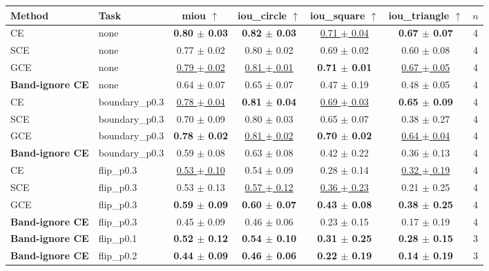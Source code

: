 \begin{tabular}{llccccc}
\toprule
Method & Task & miou $\uparrow$ & iou\_circle $\uparrow$ & iou\_square $\uparrow$ & iou\_triangle $\uparrow$ & $n$ \\
\midrule
CE & none & \textbf{0.80 $\pm$ 0.03} & \textbf{0.82 $\pm$ 0.03} & \underline{0.71 $\pm$ 0.04} & \textbf{0.67 $\pm$ 0.07} & 4 \\
SCE & none & 0.77 $\pm$ 0.02 & 0.80 $\pm$ 0.02 & 0.69 $\pm$ 0.02 & 0.60 $\pm$ 0.08 & 4 \\
GCE & none & \underline{0.79 $\pm$ 0.02} & \underline{0.81 $\pm$ 0.01} & \textbf{0.71 $\pm$ 0.01} & \underline{0.67 $\pm$ 0.05} & 4 \\
\textbf{Band-ignore CE} & none & 0.64 $\pm$ 0.07 & 0.65 $\pm$ 0.07 & 0.47 $\pm$ 0.19 & 0.48 $\pm$ 0.05 & 4 \\
\midrule
CE & boundary\_p0.3 & \underline{0.78 $\pm$ 0.04} & \textbf{0.81 $\pm$ 0.04} & \underline{0.69 $\pm$ 0.03} & \textbf{0.65 $\pm$ 0.09} & 4 \\
SCE & boundary\_p0.3 & 0.70 $\pm$ 0.09 & 0.80 $\pm$ 0.03 & 0.65 $\pm$ 0.07 & 0.38 $\pm$ 0.27 & 4 \\
GCE & boundary\_p0.3 & \textbf{0.78 $\pm$ 0.02} & \underline{0.81 $\pm$ 0.02} & \textbf{0.70 $\pm$ 0.02} & \underline{0.64 $\pm$ 0.04} & 4 \\
\textbf{Band-ignore CE} & boundary\_p0.3 & 0.59 $\pm$ 0.08 & 0.63 $\pm$ 0.08 & 0.42 $\pm$ 0.22 & 0.36 $\pm$ 0.13 & 4 \\
\midrule
CE & flip\_p0.3 & \underline{0.53 $\pm$ 0.10} & 0.54 $\pm$ 0.09 & 0.28 $\pm$ 0.14 & \underline{0.32 $\pm$ 0.19} & 4 \\
SCE & flip\_p0.3 & 0.53 $\pm$ 0.13 & \underline{0.57 $\pm$ 0.12} & \underline{0.36 $\pm$ 0.23} & 0.21 $\pm$ 0.25 & 4 \\
GCE & flip\_p0.3 & \textbf{0.59 $\pm$ 0.09} & \textbf{0.60 $\pm$ 0.07} & \textbf{0.43 $\pm$ 0.08} & \textbf{0.38 $\pm$ 0.25} & 4 \\
\textbf{Band-ignore CE} & flip\_p0.3 & 0.45 $\pm$ 0.09 & 0.46 $\pm$ 0.06 & 0.23 $\pm$ 0.15 & 0.17 $\pm$ 0.19 & 4 \\
\midrule
\textbf{Band-ignore CE} & flip\_p0.1 & \textbf{0.52 $\pm$ 0.12} & \textbf{0.54 $\pm$ 0.10} & \textbf{0.31 $\pm$ 0.25} & \textbf{0.28 $\pm$ 0.15} & 3 \\
\midrule
\textbf{Band-ignore CE} & flip\_p0.2 & \textbf{0.44 $\pm$ 0.09} & \textbf{0.46 $\pm$ 0.06} & \textbf{0.22 $\pm$ 0.19} & \textbf{0.14 $\pm$ 0.19} & 3 \\
\bottomrule
\end{tabular}
